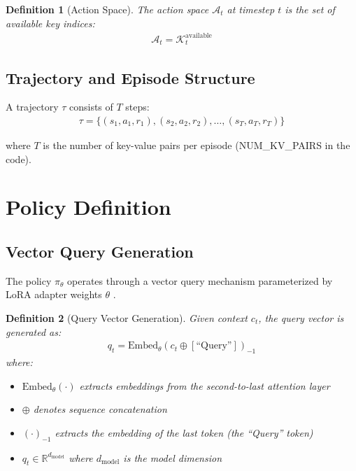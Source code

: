 \documentclass[11pt]{article}
\newtheorem{definition}{Definition}
\begin{document}
\begin{definition}[Action Space]
The action space $\mathcal{A}_t$ at timestep $t$ is the set of available key indices:
\begin{align}
\mathcal{A}_t = \mathcal{K}_t^{\text{available}}
\end{align}
\end{definition}

\subsection{Trajectory and Episode Structure}

A trajectory $\tau$ consists of $T$ steps:
\begin{align}
\tau = \{(s_1, a_1, r_1), (s_2, a_2, r_2), \ldots, (s_T, a_T, r_T)\}
\end{align}

where $T$ is the number of key-value pairs per episode (NUM\_KV\_PAIRS in the code).

\section{Policy Definition}

\subsection{Vector Query Generation}

The policy $\pi_\theta$ operates through a vector query mechanism parameterized by LoRA adapter weights $\theta$ \cite{hu2021lora}.

\begin{definition}[Query Vector Generation]
Given context $c_t$, the query vector is generated as:
\begin{align}
q_t = \text{Embed}_\theta(c_t \oplus [\text{``Query''}])_{-1}
\end{align}
where:
\begin{itemize}
    \item $\text{Embed}_\theta(\cdot)$ extracts embeddings from the second-to-last attention layer
    \item $\oplus$ denotes sequence concatenation
    \item $(\cdot)_{-1}$ extracts the embedding of the last token (the ``Query'' token)
    \item $q_t \in \mathbb{R}^{d_{\text{model}}}$ where $d_{\text{model}}$ is the model dimension
\end{itemize}
\end{definition}
\end{document}
